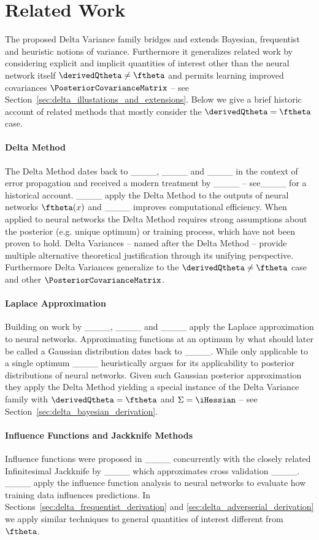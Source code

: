 \section{Related Work}
The proposed Delta Variance family bridges and extends Bayesian, frequentist and heuristic notions of variance. Furthermore it generalizes related work by considering explicit and implicit quantities of interest other than the neural network itself $\derivedQtheta \neq \ftheta$ and permits learning improved covariances $\PosteriorCovarianceMatrix$ -- see Section~\ref{sec:delta_illustations_and_extensions}. Below we give a brief historic account of related methods that mostly consider the $\derivedQtheta=\ftheta$ case.


\paragraph{Delta Method}
The Delta Method dates back to ____, ____ and ____ in the context of error propagation and received a modern treatment by ____ -- see____ for a historical account. ____ apply the Delta Method to the outputs of neural networks $\ftheta(x)$ and ____ improves computational efficiency. When applied to neural networks the Delta Method requires strong assumptions about the posterior (e.g. unique optimum) or training process, which have not been proven to hold.
Delta Variances --  named after the Delta Method -- provide multiple alternative theoretical justification through its unifying perspective. Furthermore Delta Variances generalize to the $\derivedQtheta\neq\ftheta$ case and other $\PosteriorCovarianceMatrix$.

\paragraph{Laplace Approximation}
Building on work by ____, ____ and ____ apply the Laplace approximation to neural networks. 
Approximating functions at an optimum by what should later be called a Gaussian distribution dates back to ____. 
While only applicable to a single optimum ____ heuristically argues for its applicability to posterior distributions of neural networks. Given such Gaussian posterior approximation they apply the Delta Method yielding a special instance of the Delta Variance family with $\derivedQtheta=\ftheta$ and $\Sigma=\iHessian$ -- see Section~\ref{sec:delta_bayesian_derivation}.

\paragraph{Influence Functions and Jackknife Methods}
Influence functions were proposed in ____ concurrently with the closely related Infinitesimal Jackknife by ____ which approximates cross validation ____. ____ apply the influence function analysis to neural networks to evaluate how training data influences predictions. In Sections~\ref{sec:delta_frequentist_derivation} and \ref{sec:delta_adverserial_derivation} we apply similar techniques to general quantities of interest different from $\ftheta$.



